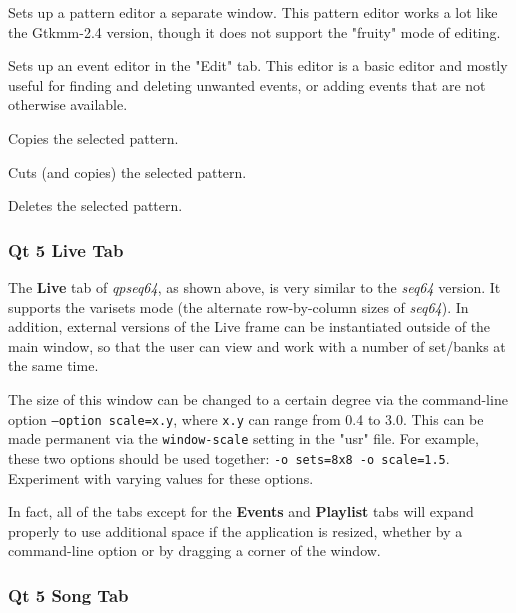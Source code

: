       Sets up a pattern editor a separate window.  This pattern editor works a
      lot like the Gtkmm-2.4 version, though it does not support the "fruity"
      mode of editing.

      Sets up an event editor in the "Edit" tab.  This editor is a basic editor
      and mostly useful for finding and deleting unwanted events, or adding
      events that are not otherwise available.

      Copies the selected pattern.

      Cuts (and copies) the selected pattern.

      Deletes the selected pattern.

\subsubsection{Qt 5 Live Tab}
\label{subsubsec:qt_portmidi_qt5_live_tab}

   The \textbf{Live} tab of \textsl{qpseq64}, as shown above, is very similar
   to the \textsl{seq64} version.  It supports the
   varisets mode (the alternate row-by-column sizes of \textsl{seq64}).
   In addition, external versions of the Live frame can be instantiated outside
   of the main window, so that the user can
   view and work with a number of set/banks at the same time.

   The size of this window can be changed to a certain degree via
   the command-line option \texttt{--option scale=x.y}, where \texttt{x.y} can
   range from 0.4 to 3.0.  This can be made permanent via the
   \texttt{window-scale} setting in the "usr" file.
   For example, these two options should be used together:
   \texttt{-o sets=8x8 -o scale=1.5}.  Experiment with varying values for these
   options.

   In fact, all of the tabs except for the \textbf{Events} and
   \textbf{Playlist}
   tabs will expand properly to
   use additional space if the application is resized, whether by a
   command-line option or by dragging a corner of the window.

\subsubsection{Qt 5 Song Tab}
\label{subsubsec:qt_portmidi_qt5_song_tab}

